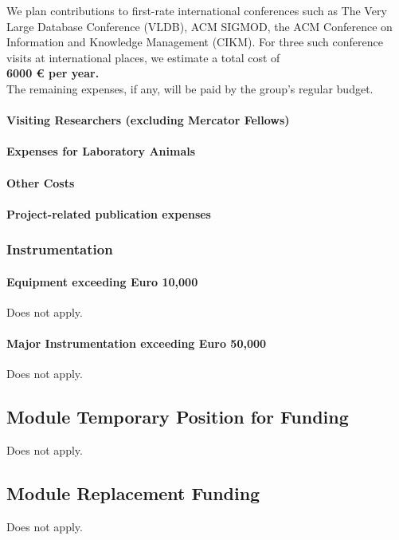 		We plan contributions to first-rate international conferences such as The Very Large Database Conference (VLDB), ACM SIGMOD, 
		the ACM Conference on Information and Knowledge Management (CIKM).
		For three such conference visits at international places, we estimate a total cost of \\

		{\bf	6000 \euro\xspace per year.} \\

		\noindent The remaining expenses, if any, will be paid by the group's regular budget.

		\paragraph{Visiting Researchers (excluding Mercator Fellows)}

		\paragraph{Expenses for Laboratory Animals}

		\paragraph{Other Costs}

		\paragraph{Project-related publication expenses}

	\subsubsection{Instrumentation}
		\paragraph{Equipment exceeding Euro 10,000}$\,$\medskip\\
Does not apply.
		\paragraph{Major Instrumentation exceeding Euro 50,000}$\,$\medskip\\
Does not apply.
\subsection{Module Temporary Position for Funding}
Does not apply.
\subsection{Module Replacement Funding}
Does not apply.
